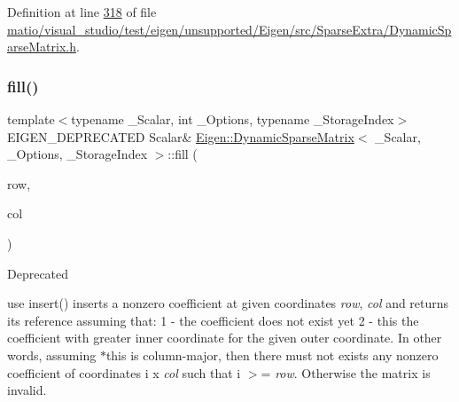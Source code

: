 Definition at line \hyperlink{matio_2visual__studio_2test_2eigen_2unsupported_2_eigen_2src_2_sparse_extra_2_dynamic_sparse_matrix_8h_source_l00318}{318} of file \hyperlink{matio_2visual__studio_2test_2eigen_2unsupported_2_eigen_2src_2_sparse_extra_2_dynamic_sparse_matrix_8h_source}{matio/visual\+\_\+studio/test/eigen/unsupported/\+Eigen/src/\+Sparse\+Extra/\+Dynamic\+Sparse\+Matrix.\+h}.

\mbox{\label{class_eigen_1_1_dynamic_sparse_matrix_a70c8f529b38fd5b7d93d6dfe1a122723}} 
\subsubsection{\texorpdfstring{fill()}{fill()}\hspace{0.1cm}{\footnotesize\ttfamily [1/2]}}
{\footnotesize\ttfamily template$<$typename \+\_\+\+Scalar, int \+\_\+\+Options, typename \+\_\+\+Storage\+Index$>$ \\
E\+I\+G\+E\+N\+\_\+\+D\+E\+P\+R\+E\+C\+A\+T\+ED Scalar\& \hyperlink{class_eigen_1_1_dynamic_sparse_matrix}{Eigen\+::\+Dynamic\+Sparse\+Matrix}$<$ \+\_\+\+Scalar, \+\_\+\+Options, \+\_\+\+Storage\+Index $>$\+::fill (\begin{DoxyParamCaption}\item[{\hyperlink{group___core___module_a554f30542cc2316add4b1ea0a492ff02}{Index}}]{row,  }\item[{\hyperlink{group___core___module_a554f30542cc2316add4b1ea0a492ff02}{Index}}]{col }\end{DoxyParamCaption})\hspace{0.3cm}{\ttfamily [inline]}}

\begin{DoxyRefDesc}{Deprecated}
\item[\hyperlink{deprecated__deprecated000086}{Deprecated}]use insert() inserts a nonzero coefficient at given coordinates {\itshape row}, {\itshape col} and returns its reference assuming that\+: 1 -\/ the coefficient does not exist yet 2 -\/ this the coefficient with greater inner coordinate for the given outer coordinate. In other words, assuming {\ttfamily $\ast$this} is column-\/major, then there must not exists any nonzero coefficient of coordinates {\ttfamily i} {\ttfamily x} {\itshape col} such that {\ttfamily i} $>$= {\itshape row}. Otherwise the matrix is invalid.\end{DoxyRefDesc}


